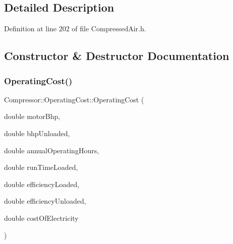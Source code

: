 \subsection{Detailed Description}


Definition at line 202 of file Compressed\+Air.\+h.



\subsection{Constructor \& Destructor Documentation}
\mbox{\label{class_compressor_1_1_operating_cost_aa5b9c984494fdfc08e31c2b7333f3657}} 
\subsubsection{\texorpdfstring{Operating\+Cost()}{OperatingCost()}\hspace{0.1cm}{\footnotesize\ttfamily [1/3]}}
{\footnotesize\ttfamily Compressor\+::\+Operating\+Cost\+::\+Operating\+Cost (\begin{DoxyParamCaption}\item[{double}]{motor\+Bhp,  }\item[{double}]{bhp\+Unloaded,  }\item[{double}]{annual\+Operating\+Hours,  }\item[{double}]{run\+Time\+Loaded,  }\item[{double}]{efficiency\+Loaded,  }\item[{double}]{efficiency\+Unloaded,  }\item[{double}]{cost\+Of\+Electricity }\end{DoxyParamCaption})}

